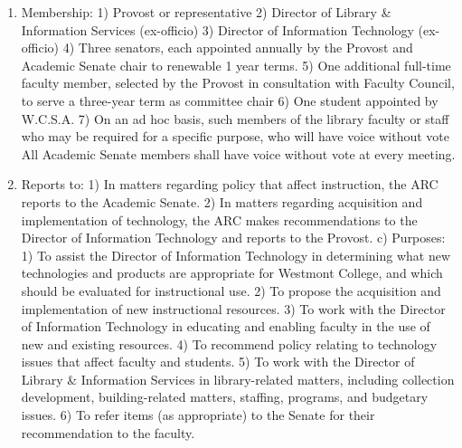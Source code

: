 \documentclass[letterpaper, 11pt]{article}
\begin{document}
				\begin{enumerate}[label=\alph*)]
					\item{Membership:}
					1) Provost or representative
					2) Director of Library \& Information Services (ex-officio)
					3) Director of Information Technology (ex-officio)
					4) Three senators, each appointed annually by the Provost and Academic Senate chair to renewable 1 year terms.
					5) One additional full-time faculty member, selected by the Provost in consultation with Faculty Council, to serve a three-year term as committee chair
					6) One student appointed by W.C.S.A.
					7) On an ad hoc basis, such members of the library faculty or staff who may be required for a specific purpose, who will have voice without vote
					All Academic Senate members shall have voice without vote at every meeting.
					\item{Reports to:}
					1) In matters regarding policy that affect instruction, the ARC reports to the Academic Senate.
					2) In matters regarding acquisition and implementation of technology, the ARC makes recommendations to the Director of Information Technology and reports to the Provost.
					c) Purposes:
					1) To assist the Director of Information Technology in determining what new technologies and products are appropriate for Westmont College, and which should be evaluated for instructional use.
					2) To propose the acquisition and implementation of new instructional resources.
					3) To work with the Director of Information Technology in educating and enabling faculty in the use of new and existing resources.
					4) To recommend policy relating to technology issues that affect faculty and students.
					5) To work with the Director of Library \& Information Services in library-related matters, including collection development, building-related matters, staffing, programs, and budgetary issues.
					6) To refer items (as appropriate) to the Senate for their recommendation to the faculty.
				\end{enumerate}
\end{document}
